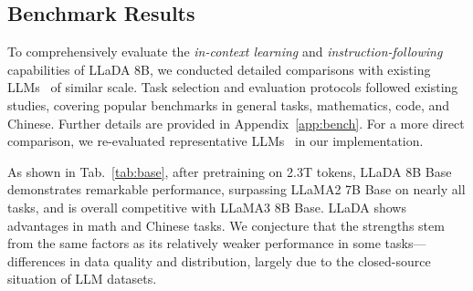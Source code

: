 \documentclass{article}
\begin{document}
\subsection{Benchmark Results}
To comprehensively evaluate the \emph{in-context learning} and \emph{instruction-following} capabilities of LLaDA 8B, we conducted detailed comparisons with existing LLMs~\citep{dubey2024llama,touvron2023llama2, qwen2,qwen2.5, bi2024deepseek,jiang2023mistral} of similar scale. Task selection and evaluation protocols followed existing studies, covering popular benchmarks in general tasks, mathematics, code, and Chinese. Further details are provided in Appendix~\ref{app:bench}. For a more direct comparison, we re-evaluated representative LLMs~\citep{dubey2024llama, touvron2023llama2} in our implementation.

As shown in Tab.~\ref{tab:base}, after pretraining on 2.3T tokens, LLaDA 8B Base demonstrates remarkable performance, surpassing LLaMA2 7B Base on nearly all tasks, and is overall competitive with LLaMA3 8B Base. LLaDA shows advantages in math and Chinese tasks. We conjecture that the strengths stem from the same factors as its relatively weaker performance in some tasks—differences in data quality and distribution, largely due to the closed-source situation of LLM datasets. 
\end{document}
